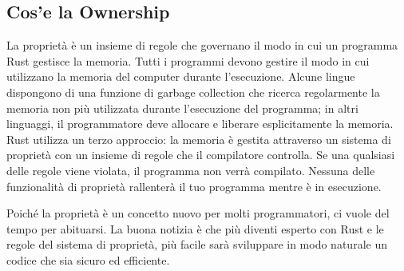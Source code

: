 \documentclass[11pt,a4paper]{article}
\begin{document}
\subsection{Cos'e la Ownership}
La proprietà è un insieme di regole che governano il modo in cui un programma Rust gestisce la memoria. Tutti i programmi devono gestire il modo in cui utilizzano la memoria del computer durante l'esecuzione. Alcune lingue dispongono di una funzione di garbage collection che ricerca regolarmente la memoria non più utilizzata durante l'esecuzione del programma; in altri linguaggi, il programmatore deve allocare e liberare esplicitamente la memoria. Rust utilizza un terzo approccio: la memoria è gestita attraverso un sistema di proprietà con un insieme di regole che il compilatore controlla. Se una qualsiasi delle regole viene violata, il programma non verrà compilato. Nessuna delle funzionalità di proprietà rallenterà il tuo programma mentre è in esecuzione.

Poiché la proprietà è un concetto nuovo per molti programmatori, ci vuole del tempo per abituarsi. La buona notizia è che più diventi esperto con Rust e le regole del sistema di proprietà, più facile sarà sviluppare in modo naturale un codice che sia sicuro ed efficiente.\\
\\
\end{document}
